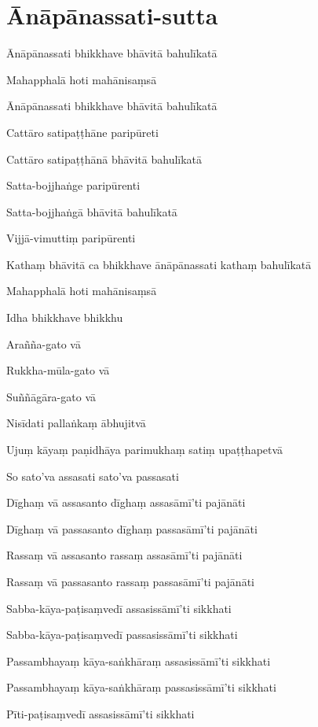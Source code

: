 \section{Ānāpānassati-sutta}


\begin{leader}
\end{leader}

{\fontsize{9.5}{13}\selectfont

Ānāpānassati bhikkhave bhāvitā bahulīkatā

Mahapphalā hoti mahānisaṃsā

Ānāpānassati bhikkhave bhāvitā bahulīkatā

Cattāro satipaṭṭhāne paripūreti

Cattāro satipaṭṭhānā bhāvitā bahulīkatā

Satta-bojjhaṅge paripūrenti

Satta-bojjhaṅgā bhāvitā bahulīkatā

Vijjā-vimuttiṃ paripūrenti

Kathaṃ bhāvitā ca bhikkhave ānāpānassati kathaṃ bahulīkatā

Mahapphalā hoti mahānisaṃsā

Idha bhikkhave bhikkhu

Arañña-gato vā

Rukkha-mūla-gato vā

Suññāgāra-gato vā

Nisīdati pallaṅkaṃ ābhujitvā

Ujuṃ kāyaṃ paṇidhāya parimukhaṃ satiṃ upaṭṭhapetvā

So sato'va assasati sato'va passasati

Dīghaṃ vā assasanto dīghaṃ assasāmī'ti pajānāti

Dīghaṃ vā passasanto dīghaṃ passasāmī'ti pajānāti

Rassaṃ vā assasanto rassaṃ assasāmī'ti pajānāti

Rassaṃ vā passasanto rassaṃ passasāmī'ti pajānāti

Sabba-kāya-paṭisaṃvedī assasissāmī'ti sikkhati

Sabba-kāya-paṭisaṃvedī passasissāmī'ti sikkhati

Passambhayaṃ kāya-saṅkhāraṃ assasissāmī'ti sikkhati

Passambhayaṃ kāya-saṅkhāraṃ passasissāmī'ti sikkhati

Pīti-paṭisaṃvedī assasissāmī'ti sikkhati

}
